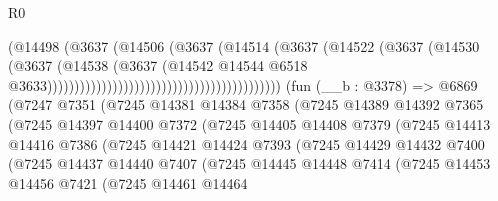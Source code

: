 \begin{lexlean}{R0}
\begin{coremodule}
                                                                (@14498
                                                                  (@3637
                                                                    (@14506
                                                                      (@3637
                                                                        (@14514
                                                                          (@3637
                                                                            (@14522
                                                                              (@3637
                                                                                (@14530
                                                                                  (@3637
                                                                                    (@14538
                                                                                      (@3637
                                                                                        (@14542
                                                                                          @14544
                                                                                          @6518
                                                                                          @3633)))))))))))))))))))))))))))))))))))))))))))
    (fun (__b : @3378) =>
    @6869
      (@7247
        @7351
        (@7245
          @14381
          @14384
          @7358
          (@7245
            @14389
            @14392
            @7365
            (@7245
              @14397
              @14400
              @7372
              (@7245
                @14405
                @14408
                @7379
                (@7245
                  @14413
                  @14416
                  @7386
                  (@7245
                    @14421
                    @14424
                    @7393
                    (@7245
                      @14429
                      @14432
                      @7400
                      (@7245
                        @14437
                        @14440
                        @7407
                        (@7245
                          @14445
                          @14448
                          @7414
                          (@7245
                            @14453
                            @14456
                            @7421
                            (@7245
                              @14461
                              @14464

\end{coremodule}
\end{lexlean}
